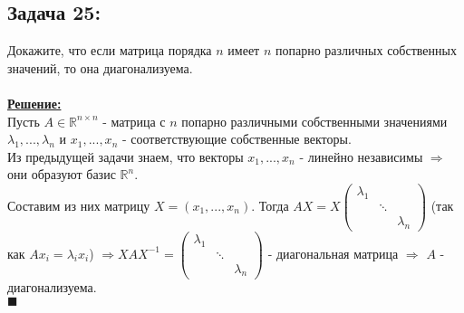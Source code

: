 \documentclass[a4paper,12pt,titlepage,final]{article}
\begin{document}
\subsection*{Задача 25:}
\noindent Докажите, что если матрица порядка $n$ имеет $n$ попарно различных собственных значений, то она диагонализуема. \\ \\
\textbf{\underline{Решение:}} \\
Пусть $A \in \mathbb{R}^{n \times n}$ - матрица с $n$ попарно различными собственными значениями $\lambda_1, ... , \lambda_n$ и 
$x_1, ... , x_n$ - соответствующие собственные векторы. \\
Из предыдущей задачи знаем, что векторы $x_1, ... , x_n$ - линейно независимы $\Rightarrow$ они образуют
базис $\mathbb{R}^n$. \\
Составим из них матрицу $X = (x_1, ... , x_n)$.
Тогда $AX = X
\begin{pmatrix}
    \lambda_1 & & \\
     & \ddots & \\
     & & \lambda_n
\end{pmatrix}
$ (так как $Ax_i = \lambda_i x_i$) $\Rightarrow XAX^{-1} =
\begin{pmatrix}
    \lambda_1 & & \\
     & \ddots & \\
     & & \lambda_n
\end{pmatrix}$ - диагональная матрица $\Rightarrow$ $A$ - диагонализуема. \\ $\blacksquare$ \\ \\ \\


\end{document}
